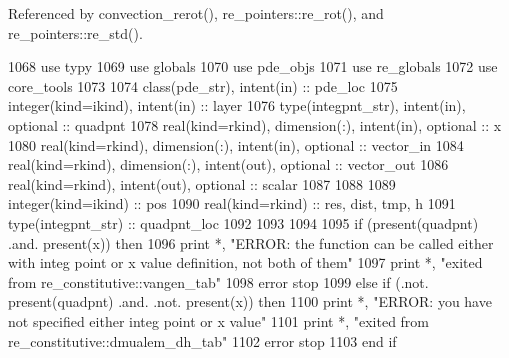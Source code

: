 Referenced by convection\+\_\+rerot(), re\+\_\+pointers\+::re\+\_\+rot(), and re\+\_\+pointers\+::re\+\_\+std().


\begin{DoxyCode}
1068       \textcolor{keywordtype}{use }typy
1069       \textcolor{keywordtype}{use }globals
1070       \textcolor{keywordtype}{use }pde_objs
1071       \textcolor{keywordtype}{use }re_globals
1072       \textcolor{keywordtype}{use }core_tools
1073 
1074       \textcolor{keywordtype}{class}(pde_str), \textcolor{keywordtype}{intent(in)} :: pde\_loc
1075       \textcolor{keywordtype}{integer(kind=ikind)}, \textcolor{keywordtype}{intent(in)} :: layer
1076       \textcolor{keywordtype}{type}(integpnt_str), \textcolor{keywordtype}{intent(in)}, \textcolor{keywordtype}{optional} :: quadpnt    
1078       \textcolor{keywordtype}{real(kind=rkind)}, \textcolor{keywordtype}{dimension(:)}, \textcolor{keywordtype}{intent(in)}, \textcolor{keywordtype}{optional} :: x
1080       \textcolor{keywordtype}{real(kind=rkind)}, \textcolor{keywordtype}{dimension(:)}, \textcolor{keywordtype}{intent(in)}, \textcolor{keywordtype}{optional} :: vector\_in
1084       \textcolor{keywordtype}{real(kind=rkind)}, \textcolor{keywordtype}{dimension(:)}, \textcolor{keywordtype}{intent(out)}, \textcolor{keywordtype}{optional} :: vector\_out
1086       \textcolor{keywordtype}{real(kind=rkind)}, \textcolor{keywordtype}{intent(out)}, \textcolor{keywordtype}{optional} :: scalar
1087 
1088 
1089       \textcolor{keywordtype}{integer(kind=ikind)} :: pos
1090       \textcolor{keywordtype}{real(kind=rkind)} :: res, dist, tmp, h
1091       \textcolor{keywordtype}{type}(integpnt_str) :: quadpnt\_loc     
1092       
1093     
1094       
1095       \textcolor{keywordflow}{if} (\textcolor{keyword}{present}(quadpnt) .and. \textcolor{keyword}{present}(x)) \textcolor{keywordflow}{then}
1096         print *, \textcolor{stringliteral}{"ERROR: the function can be called either with integ point or x value definition, not both
       of them"}
1097         print *, \textcolor{stringliteral}{"exited from re\_constitutive::vangen\_tab"}
1098         error stop
1099       \textcolor{keywordflow}{else} \textcolor{keywordflow}{if} (.not. \textcolor{keyword}{present}(quadpnt) .and. .not. \textcolor{keyword}{present}(x)) \textcolor{keywordflow}{then}
1100         print *, \textcolor{stringliteral}{"ERROR: you have not specified either integ point or x value"}
1101         print *, \textcolor{stringliteral}{"exited from re\_constitutive::dmualem\_dh\_tab"}
1102         error stop
1103 \textcolor{keywordflow}{      end if}

\end{DoxyCode}
